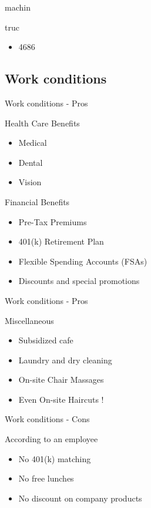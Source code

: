 \documentclass{beamer}
\begin{document}
\begin{frame}{machin}
	\begin{block}{truc}
		\begin{itemize}
			\item<+->{4686}
		\end{itemize}
	\end{block}
\end{frame}

\subsection{Work conditions}
\begin{frame}{Work conditions - Pros}

	\begin{block}{Health Care Benefits}
		\begin{itemize}
			\item<+->{Medical}
			\item<+->{Dental}
			\item<+->{Vision}
		\end{itemize}
	\end{block}
	\begin{block}{Financial Benefits}
		\begin{itemize}
			\item<+->{Pre-Tax Premiums}
			\item<+->{401(k) Retirement Plan}
			\item<+->{Flexible Spending Accounts (FSAs)}
			\item<+->{Discounts and special promotions}
		\end{itemize}
	\end{block}
\end{frame}
\begin{frame}{Work conditions - Pros}
	\begin{block}{Miscellaneous}
		\begin{itemize}
			\item<+->{Subsidized cafe}
			\item<+->{Laundry and dry cleaning}
			\item<+->{On-site Chair Massages}
			\item<+->{Even On-site Haircuts !}
		\end{itemize}
	\end{block}
\end{frame}

\begin{frame}{Work conditions - Cons}
	\begin{block}{According to an employee}
		\begin{itemize}
			\item<+->{No 401(k) matching}
			\item<+->{No free lunches}
			\item<+->{No discount on company products}
		\end{itemize}
	\end{block}
\end{frame}
\end{document}
